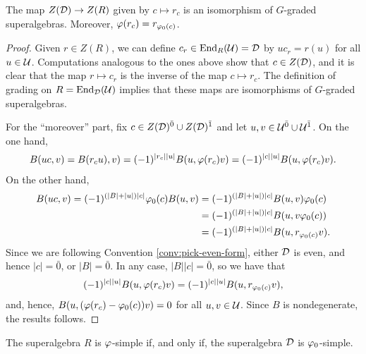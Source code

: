 \begin{prop}%
	The map $Z(\mathcal{D}) \to Z(R)$ given by $c \mapsto r_c$ is an isomorphism of $G$-graded superalgebras.
	Moreover, $\varphi (r_c) = r_{\varphi_0(c)}$.
\end{prop}

\begin{proof}
	Given $r\in Z(R)$, we can define $c_r\in \operatorname{End}_R (\mathcal U) =\mathcal{D}$ by $uc_r = r(u)$ for all $u\in \mathcal U$.
	Computations analogous to the ones above show that $c\in Z(\mathcal{D})$, and it is clear that the map $r\mapsto c_r$ is the inverse of the map $c \mapsto r_c$.
	The definition of grading on $R = \operatorname{End}_{\mathcal{D}} (\mathcal U)$ implies that these maps are isomorphisms of $G$-graded superalgebras.

	For the ``moreover'' part, fix $c\in Z(\mathcal{D})^{\bar0} \cup Z(\mathcal{D})^{\bar1}$ and let $u, v \in \mathcal U^{\bar0} \cup \mathcal U^{\bar1}$.
	On the one hand,
	\begin{align*}
		B(uc,v) = B(r_c u), v) = (-1)^{|r_c||u|} B(u, \varphi(r_c) v) = (-1)^{|c||u|} B(u, \varphi(r_c) v).
	\end{align*}
	On the other hand,
	\begin{align*}
		B(uc, v) = (-1)^{(|B| + |u|) |c|} \varphi_0(c) B(u, v) & = (-1)^{(|B| + |u|) |c|} B(u, v) \varphi_0(c)     \\
		                                                     & = (-1)^{(|B| + |u|) |c|} B(u, v \varphi_0(c) )    \\
		                                                     & = (-1)^{(|B| + |u|) |c|} B(u, r_{\varphi_0(c)}v).
	\end{align*}
	Since we are following Convention \ref{conv:pick-even-form}, either $\mathcal{D}$ is even, and hence $|c| = \bar 0$, or
	$|B| = \bar 0$.
	In any case, $|B||c| = \bar 0$, so we have that \[(-1)^{|c||u|} B(u, \varphi(r_c) v) = (-1)^{|c||u|} B(u, r_{\varphi_0(c)}v),\] and, hence, $B(u, (\varphi(r_c) - \varphi_0(c)) v) = 0$ for all $u, v \in \mathcal U$.
	Since $B$ is nondegenerate, the results follows.
\end{proof}

\begin{prop}\label{prop:vphi-R-simple-D-simple}
	The superalgebra $R$ is $\varphi$-simple if, and only if, the superalgebra $\mathcal{D}$ is $\varphi_0$-simple.
\end{prop}


